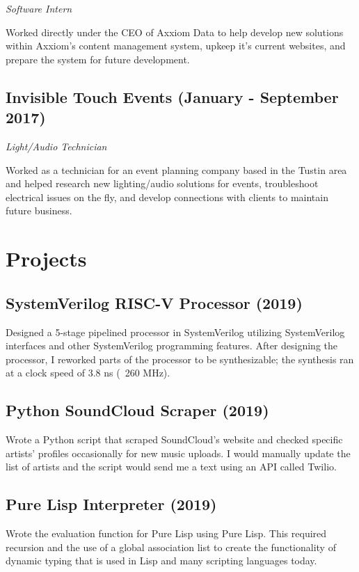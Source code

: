 \documentclass{article}
\begin{document}
\noindent\textit{Software Intern}

Worked directly under the CEO of Axxiom Data to help develop new solutions within Axxiom's
content management system, upkeep it's current websites, and prepare the system for future development.

\subsection{Invisible Touch Events (January - September 2017)} 

\noindent\textit{Light/Audio Technician}

Worked as a technician for an event planning company based in the Tustin area and helped research
new lighting/audio solutions for events, troubleshoot electrical issues on the fly, and develop 
connections with clients to maintain future business.

\section{Projects}

\subsection{SystemVerilog RISC-V Processor (2019)}

Designed a 5-stage pipelined processor in SystemVerilog utilizing SystemVerilog interfaces and other 
SystemVerilog programming features. After designing the processor, I reworked parts of the processor 
to be synthesizable; the synthesis ran at a clock speed of 3.8 ns (~260 MHz).

\subsection{Python SoundCloud Scraper (2019)}

Wrote a Python script that scraped SoundCloud's website and checked specific artists' profiles occasionally for new music uploads. 
I would manually update the list of artists and the script would send me a text using an API called Twilio.

\subsection{Pure Lisp Interpreter (2019)}

Wrote the evaluation function for Pure Lisp using Pure Lisp. This required recursion and the use of a global 
association list to create the functionality of dynamic typing that is used in Lisp and many scripting languages today.
\end{document}
